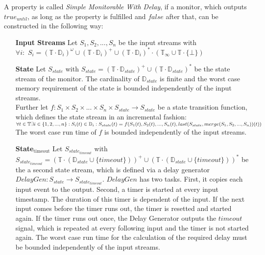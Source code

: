 	\begin{definition}
		A property is called \textit{Simple Monitorable With Delay}, if a monitor, which outputs $true_{until}$, as long as the property is fulfilled and $false$ after that, can be constructed in the following way:
		\begin{itemize}
			\item[\textbf{Input Streams}]
				Let $S_1, S_2, ..., S_n$ be the input streams with\\
				$\forall i:$ $S_i=(\mathbb{T}\cdot \mathbb{D}_i)^\omega\cup(\mathbb{T}\cdot \mathbb{D}_i)^+\cup(\mathbb{T}\cdot \mathbb{D}_i)^*\cdot(\mathbb{T}_\infty\cup\mathbb{T}\cdot\{\bot\})$
			\item[\textbf{State}]
				Let $S_{state}$ with $S_{state}= (\mathbb{T}\cdot \mathbb{D}_{state})^+\cup(\mathbb{T}\cdot \mathbb{D}_{state})^*$ be the state stream of the monitor. The cardinality of $\mathbb{D}_{state}$ is finite and the worst case memory requirement of the state is bounded independently of the input streams.\\
				Further let $f: S_1 \times S_2 \times ... \times S_n \times S_{state}\rightarrow S_{state}$ be a state transition function, which defines the state stream in an incremental fashion:
				\begin{math}
					\forall t\in \mathbb T \exists i\in \{1,2,...,n\}: S_i(t)\in\mathbb D_i:\\
					S_{state}(t)= f(S_1(t), S_2(t), ..., S_n(t), last(S_{state}, merge(S_1, S_2, ..., S_n))(t))
				\end{math}\\
				The worst case run time of $f$ is bounded independently of the input streams.
			\item[\textbf{State$_\text{timeout}$}]
				Let $S_{state_{timeout}}$ with $S_{state_{timeout}}= (\mathbb{T}\cdot (\mathbb{D}_{state}\cup \{timeout\}))^+\cup(\mathbb{T}\cdot (\mathbb{D}_{state}\cup \{timeout\}))^*$ be the a second state stream, which is defined via a delay generator $DelayGen: S_{state}\rightarrow S_{state_{timeout}}$. $DelayGen$ has two tasks. First, it copies each input event to the output. Second, a timer is started at every input timestamp. The duration of this timer is dependent of the input. If the next input comes before the timer runs out, the timer is resetted and started again. If the timer runs out once, the Delay Generator outputs the $timeout$ signal, which is repeated at every following input and the timer is not started again. The worst case run time for the calculation of the required delay must be bounded independently of the input streams.

\end{itemize}
\end{definition}
